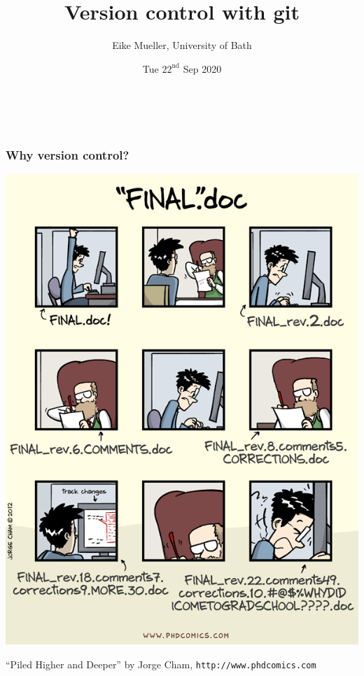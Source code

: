 \documentclass{beamer}
\begin{document}
\title{Version control with git}
\author{Eike Mueller, University of Bath}
\date{Tue $22^{\text{nd}}$ Sep 2020} 


\begin{frame}
  \frametitle{$ $}
  \titlepage
\end{frame}


\begin{frame}
  \frametitle{Why version control?}
  \begin{center}
    \includegraphics[width=0.5\linewidth]{phdcomics.png}
  \end{center}
  {\footnotesize ``Piled Higher and Deeper'' by Jorge Cham, \texttt{http://www.phdcomics.com}}
\end{frame}

\end{document}
